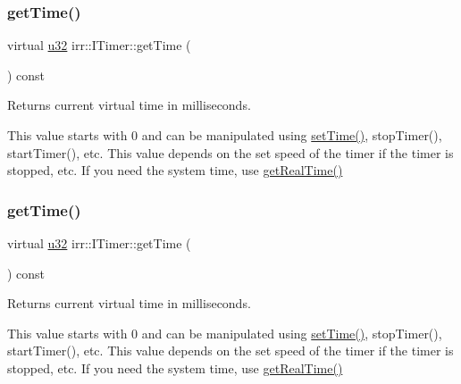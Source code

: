 \subsubsection{\texorpdfstring{get\+Time()}{getTime()}\hspace{0.1cm}{\footnotesize\ttfamily [1/2]}}
{\footnotesize\ttfamily virtual \hyperlink{namespaceirr_a0416a53257075833e7002efd0a18e804}{u32} irr\+::\+I\+Timer\+::get\+Time (\begin{DoxyParamCaption}{ }\end{DoxyParamCaption}) const\hspace{0.3cm}{\ttfamily [pure virtual]}}



Returns current virtual time in milliseconds. 

This value starts with 0 and can be manipulated using \hyperlink{classirr_1_1ITimer_ae93bf312ccf87478565e080450291386}{set\+Time()}, stop\+Timer(), start\+Timer(), etc. This value depends on the set speed of the timer if the timer is stopped, etc. If you need the system time, use \hyperlink{classirr_1_1ITimer_a67d6b3ae61c2e6aaad82c4ae15ab55f1}{get\+Real\+Time()} \mbox{\label{classirr_1_1ITimer_aa2c53890268d6886b3b5bbf2af5dba9c}} 
\subsubsection{\texorpdfstring{get\+Time()}{getTime()}\hspace{0.1cm}{\footnotesize\ttfamily [2/2]}}
{\footnotesize\ttfamily virtual \hyperlink{namespaceirr_a0416a53257075833e7002efd0a18e804}{u32} irr\+::\+I\+Timer\+::get\+Time (\begin{DoxyParamCaption}{ }\end{DoxyParamCaption}) const\hspace{0.3cm}{\ttfamily [pure virtual]}}



Returns current virtual time in milliseconds. 

This value starts with 0 and can be manipulated using \hyperlink{classirr_1_1ITimer_ae93bf312ccf87478565e080450291386}{set\+Time()}, stop\+Timer(), start\+Timer(), etc. This value depends on the set speed of the timer if the timer is stopped, etc. If you need the system time, use \hyperlink{classirr_1_1ITimer_a67d6b3ae61c2e6aaad82c4ae15ab55f1}{get\+Real\+Time()} \mbox{\label{classirr_1_1ITimer_a13f3f4919a3431733bc90cd87d110675}} 
